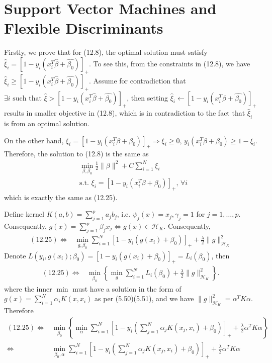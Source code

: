 \chapter{Support Vector Machines and Flexible Discriminants}
\label{ch:12}

\begin{exercise}
  Firstly, we prove that for (12.8), the optimal solution must satisfy 
  $\hat{\xi}_i = [1-y_i(x_i^ T\hat{\beta} + \hat{\beta_0})]_+$. To see this,
  from the constraints in (12.8), we have $\hat{\xi}_i \geq [1-y_i(x_i^
  T\hat{\beta} + \hat{\beta_0})]_+$. Assume for contradiction that
  $\exists i \mbox{ such that }\hat{\xi} > [1-y_i(x_i^ T\hat{\beta} +
  \hat{\beta_0})]_+$, then setting $\hat{\xi}_i\leftarrow [1-y_i(x_i^
  T\hat{\beta} + \hat{\beta_0})]_+$ results in smaller objective in (12.8),
  which is in contradiction to the fact that $\hat{\xi}_i$ is from an optimal
  solution.
  
  On the other hand, $\xi_i = [1-y_i(x_i^ T\beta + \beta_0)]_+ \Rightarrow
  \xi_i\geq 0,\,y_i(x_i^ T\beta + \beta_0)\geq 1-\xi_i$. Therefore, the solution to (12.8) is the same as
  \begin{align}
    & \min_{\beta,\beta_0}\frac{1}{2}\|\beta\|^2 + C\sum_{i=1}^N\xi_i\\
    & \mbox{s.t. } \xi_i = [1-y_i(x_i^ T\beta + \beta_0)]_+,\,\forall　i
  \end{align}
  which is exactly the same as (12.25).
\end{exercise}

\begin{exercise}
  \label{ex:12_2}
  Define kernel $K(a, b) = \sum_{j=1}^pa_jb_j$, i.e. $\psi_j(x) = x_j,
  \gamma_j=1$ for $j = 1,\ldots,p$. Consequently, $g(x) =
  \sum_{j=1}^p\beta_jx_j \Leftrightarrow g(x)\in\mathcal{H}_K$. Consequently, 
  \begin{align}
    (12.25) \Leftrightarrow &\min_{g,\beta_0}\sum_{i=1}^N [1-y_i(g(x_i) +
    \beta_0)]_+ + \frac{\lambda}{2} \|g\|_{\mathcal{H}_K}^2
  \end{align}
  Denote $L(y_i, g(x_i);\beta_0) = [1-y_i(g(x_i) + \beta_0)]_+ = L_i(\beta_0)$,
  then
  \begin{align}
    (12.25) \Leftrightarrow & \min_{\beta_0}\left\{\min_{g}\sum_{i=1}^N
    L_i(\beta_0) + \frac{\lambda}{2} \|g\|_{\mathcal{H}_K}^2 \right\}.
  \end{align}
  where the inner $\min$ must have a solution in the form of
  $g(x)=\sum_{i=1}^N\alpha_iK(x, x_i)$ as per (5.50)(5.51), and we have
  $\|g\|_{\mathcal{H}_K}^2 = \alpha^TK\alpha$. Therefore
  \begin{align}
    (12.25) \Leftrightarrow & \min_{\beta_0}\left\{\min_{\alpha}\sum_{i=1}^N
    [1-y_i(\sum_{j=1}^N\alpha_jK(x_j, x_i)+ \beta_0)]_+ + \frac{\lambda}{2}
    \alpha^TK\alpha \right\} \\ 
    \Leftrightarrow & \min_{\beta_0, \alpha}\sum_{i=1}^N
    [1-y_i(\sum_{j=1}^N\alpha_jK(x_j, x_i)+ \beta_0)]_+ + \frac{\lambda}{2}
    \alpha^TK\alpha 
  \end{align}
\end{exercise}

